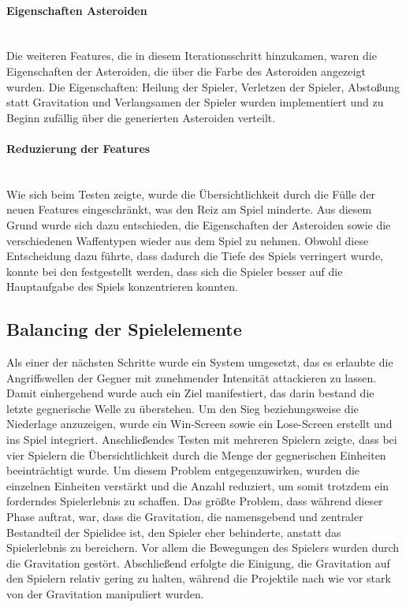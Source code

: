 \documentclass[11pt]{scrartcl}
\newcommand{\lbparagraph}[1]{\paragraph*{#1}\mbox{}\\}
\begin{document}
\lbparagraph{Eigenschaften Asteroiden}
Die weiteren Features, die in diesem Iterationsschritt hinzukamen, waren die Eigenschaften der Asteroiden, die über die Farbe des Asteroiden angezeigt wurden. Die Eigenschaften: Heilung der Spieler, Verletzen der Spieler, Abstoßung statt Gravitation und Verlangsamen der Spieler wurden implementiert und zu Beginn zufällig über die generierten Asteroiden verteilt.

\lbparagraph{Reduzierung der Features}
Wie sich beim Testen zeigte, wurde die Übersichtlichkeit durch die Fülle der neuen Features eingeschränkt, was den Reiz am Spiel minderte. Aus diesem Grund wurde sich dazu entschieden, die Eigenschaften der Asteroiden sowie die verschiedenen Waffentypen wieder aus dem Spiel zu nehmen. Obwohl diese Entscheidung dazu führte, dass dadurch die Tiefe des Spiels verringert wurde, konnte bei den  festgestellt werden, dass sich die Spieler besser auf die Hauptaufgabe des Spiels konzentrieren konnten.

\subsection{Balancing der Spielelemente}
Als einer der nächsten Schritte wurde ein System umgesetzt, das es erlaubte die Angriffswellen der Gegner mit zunehmender Intensität attackieren zu lassen. Damit einhergehend wurde auch ein Ziel manifestiert, das darin bestand die letzte gegnerische Welle zu überstehen. Um den Sieg beziehungsweise die Niederlage anzuzeigen, wurde ein Win-Screen sowie ein Lose-Screen erstellt und ins Spiel integriert.
Anschließendes Testen mit mehreren Spielern zeigte, dass bei vier Spielern die Übersichtlichkeit durch die Menge der gegnerischen Einheiten beeinträchtigt wurde. Um diesem Problem entgegenzuwirken, wurden die einzelnen Einheiten verstärkt und die Anzahl reduziert, um somit trotzdem ein forderndes Spielerlebnis zu schaffen.
Das größte Problem, dass während dieser Phase auftrat, war, dass die Gravitation, die namensgebend und zentraler Bestandteil der Spielidee ist, den Spieler eher behinderte, anstatt das Spielerlebnis zu bereichern. Vor allem die Bewegungen des Spielers wurden durch die Gravitation gestört. Abschließend erfolgte die Einigung, die Gravitation auf den Spielern relativ gering zu halten, während die Projektile nach wie vor stark von der Gravitation manipuliert wurden.
\newpage
\end{document}
